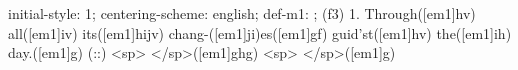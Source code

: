 initial-style: 1;
centering-scheme: english;
def-m1: \grealign;
(f3) 1. Through([em1]hv) all([em1]iv) its([em1]hijv) chang-([em1]ji)es([em1]gf) guid'st([em1]hv) the([em1]ih) day.([em1]g) (::) <sp> </sp>([em1]ghg) <sp> </sp>([em1]g)